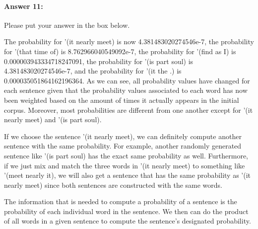 \documentclass[10pt]{article}
\newenvironment{AnswerBox}{\begin{mdframed}[style=simple]}{\end{mdframed}}
\begin{document}
\paragraph{Answer 11:} Please put your answer in the box below.

\begin{AnswerBox}%


The probability for '(it nearly meet) is now 4.381483020274546e-7, the probability for '(that time of) is 8.762966040549092e-7, the probability for '(find as I) is 0.000003943334718247091, the probability for '(is part soul) is 4.381483020274546e-7, and the probability for '(it the .) is 0.000035051864162196364. As we can see, all probability values have changed for each sentence given that the probability values associated to each word has now been weighted based on the amount of times it actually appears in the initial corpus. Moreover, most probabilities are different from one another except for  '(it nearly meet) and '(is part soul).

If we choose the sentence '(it nearly meet), we can definitely compute another sentence with the same probability. For example, another randomly generated sentence like '(is part soul) has the exact same probability as well. Furthermore, if we just mix and match the three words in '(it nearly meet) to something like '(meet nearly it), we will also get a sentence that has the same probability as '(it nearly meet) since both sentences are constructed with the same words.

The information that is needed to compute a probability of a sentence is the probability of each individual word in the sentence. We then can do the product of all words in a given sentence to compute the sentence's designated probability.

\end{AnswerBox}%
\end{document}
